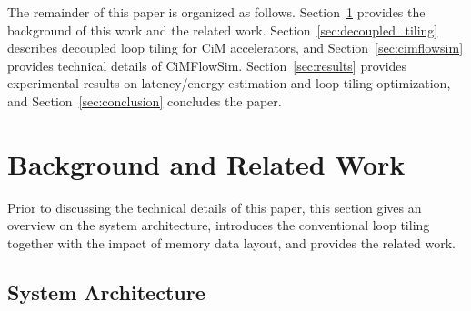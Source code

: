 \documentclass[lettersize,journal]{IEEEtran}
\begin{document}
The remainder of this paper is organized as follows.
Section~\ref{sec:background} provides the background of this work and the related work.
Section~\ref{sec:decoupled_tiling} describes decoupled loop tiling for CiM accelerators, and Section~\ref{sec:cimflowsim} provides technical details of CiMFlowSim. Section~\ref{sec:results} provides experimental results on latency/energy estimation and loop tiling optimization, and Section~\ref{sec:conclusion} concludes the paper.

\section{Background and Related Work}
\label{sec:background}

Prior to discussing the technical details of this paper, this section gives an overview on the system architecture, introduces the conventional loop tiling together with the impact of memory data layout, and provides the related work.

\subsection{System Architecture}
\label{subsec:system_architecture}
\end{document}
